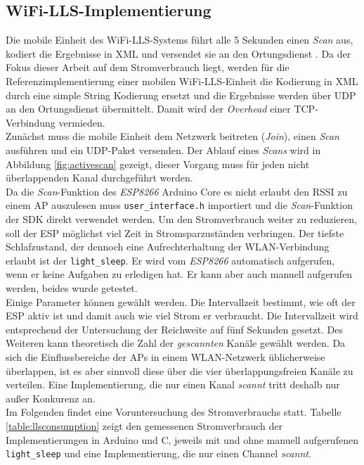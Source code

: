\subsection{WiFi-LLS-Implementierung}
\label{ch:phase1:sec:wifills}
Die mobile Einheit des WiFi-LLS-Systems führt alle 5 Sekunden einen \emph{Scan} aus, kodiert die Ergebnisse in XML und versendet sie an den Ortungsdienst \cite{chen2007design}.
Da der Fokus dieser Arbeit auf dem Stromverbrauch liegt, werden für die Referenzimplementierung einer mobilen WiFi-LLS-Einheit die Kodierung in XML durch eine simple String Kodierung ersetzt und die Ergebnisse werden über UDP an den Ortungsdienst übermittelt. 
Damit wird der \emph{Overhead} einer TCP-Verbindung vermieden.\\
Zunächst muss die mobile Einheit dem Netzwerk beitreten (\emph{Join}), einen \emph{Scan} ausführen und ein UDP-Paket versenden.
Der Ablauf eines \emph{Scans} wird in Abbildung \ref{fig:activescan} gezeigt, dieser Vorgang muss für jeden nicht überlappenden Kanal durchgeführt werden.\\
Da die \emph{Scan}-Funktion des \emph{ESP8266} Arduino Core es nicht erlaubt den RSSI zu einem AP auszulesen muss \texttt{user\_interface.h} importiert und die \emph{Scan}-Funktion der SDK direkt verwendet werden.
Um den Stromverbrauch weiter zu reduzieren, soll der ESP möglichst viel Zeit in Stromsparzuständen verbringen.
Der tiefste Schlafzustand, der dennoch eine Aufrechterhaltung der WLAN-Verbindung erlaubt ist der \texttt{light\_sleep}. 
Er wird vom \emph{ESP8266} automatisch aufgerufen, wenn er keine Aufgaben zu erledigen hat.
Er kann aber auch manuell aufgerufen werden, beides wurde getestet.\\
Einige Parameter können gewählt werden. 
Die Intervallzeit bestimmt, wie oft der ESP aktiv ist und damit auch wie viel Strom er verbraucht.
Die Intervallzeit wird entsprechend der Untersuchung der Reichweite auf fünf Sekunden gesetzt.
Des Weiteren kann theoretisch die Zahl der \emph{gescannten} Kanäle gewählt werden. 
Da sich die Einflussbereiche der APs in einem WLAN-Netzwerk üblicherweise überlappen, ist es aber sinnvoll diese über die vier überlappungsfreien Kanäle zu verteilen. 
Eine Implementierung, die nur einen Kanal \emph{scannt} tritt deshalb nur außer Konkurenz an.\\
Im Folgenden findet eine Voruntersuchung des Stromverbrauchs statt.
Tabelle \ref{table:llsconsumption} zeigt den gemessenen Stromverbrauch der Implementierungen in Arduino und C, jeweils mit und ohne manuell aufgerufenen \texttt{light\_sleep} und eine Implementierung, die nur einen Channel \emph{scannt}.

